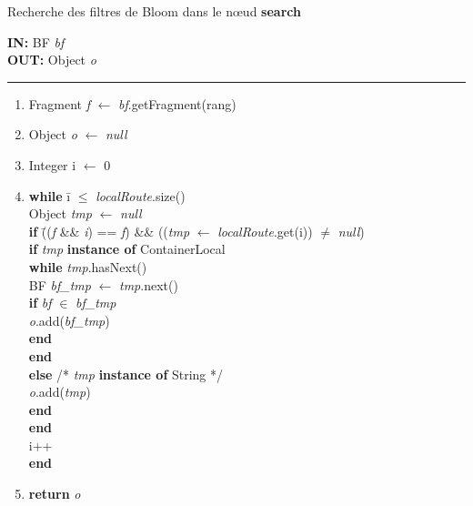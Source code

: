 \documentclass[a4paper,11pt]{report}
\begin{document}
\newpage
\begin{algorithme}
	Recherche des filtres de Bloom dans le nœud \textbf{search}
\end{algorithme}

\begin{flushleft}
	\begin{framed}
		\textbf{IN:} BF \textit{bf}\\
		\textbf{OUT:} Object \textit{o}\\
		\noindent\rule{\linewidth}{0.5pt}

		\begin{enumerate}
			\item Fragment \textit{f} $\leftarrow$ \textit{bf}.getFragment(rang)
			\item Object \textit{o} $\leftarrow$ \textit{null}
			\item Integer i $\leftarrow$ 0
			\item 
				\begin{tabbing}
					\textbf{wh}\=\textbf{ile }\=i $\leq$ \textit{localRoute}.size()\\
						\> Object \textit{tmp} $\leftarrow$ \textit{null}\\
						\> \textbf{if }\= ((\textit{f} \&\& \textit{i}) == \textit{f}) \&\& ((\textit{tmp } $\leftarrow$ \textit{localRoute}.get(i)) $\neq$ \textit{null})\\
						\> \> \textbf{if }\= \textit{tmp} \textbf{instance of} ContainerLocal\\
						\> \> \> \textbf{wh}\=\textbf{ile }\textit{tmp}.hasNext()\\
						\> \> \> \> BF \textit{bf\_tmp} $\leftarrow$ \textit{tmp}.next()\\
						\> \> \> \> \textbf{if }\= \textit{bf} $\in$ \textit{bf\_tmp}\\
						\> \> \> \> \> \textit{o}.add(\textit{bf\_tmp})\\
						\> \> \> \> \textbf{end}\\ 
						\> \> \> \textbf{end} \\
						\> \> \textbf{else} /* \textit{tmp} \textbf{instance of} String */\\
						\> \> \> \textit{o}.add(\textit{tmp})\\
						\> \> \textbf{end}\\
						\> \textbf{end}\\ 
						\> i++\\
					\textbf{end}
				\end{tabbing}
			\item \textbf{return} \textit{o}
		\end{enumerate}	
	\end{framed}
\end{flushleft}
\end{document}
